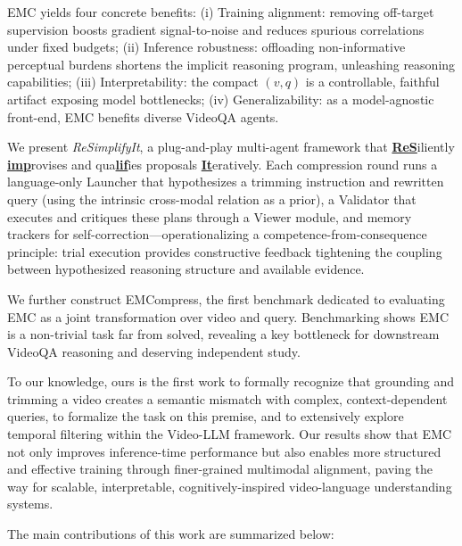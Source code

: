EMC yields four concrete benefits: (i) Training alignment: removing off-target supervision boosts gradient signal-to-noise and reduces spurious correlations under fixed budgets; (ii) Inference robustness: offloading non-informative perceptual burdens shortens the implicit reasoning program, unleashing reasoning capabilities; (iii) Interpretability: the compact $(v, q)$ is a controllable, faithful artifact exposing model bottlenecks; (iv) Generalizability: as a model-agnostic front-end, EMC benefits diverse VideoQA agents.

We present \textit{ReSimplifyIt}, a plug-and-play multi-agent framework that \underline{\textbf{ReS}}iliently \underline{\textbf{imp}}rovises and qua\underline{\textbf{lif}}ies proposals \underline{\textbf{It}}eratively. Each compression round runs a language-only Launcher that hypothesizes a trimming instruction and rewritten query (using the intrinsic cross-modal relation as a prior), a Validator that executes and critiques these plans through a Viewer module, and memory trackers for self-correction---operationalizing a competence-from-consequence~\citep{brooks1991intelligence} principle: trial execution provides constructive feedback tightening the coupling between hypothesized reasoning structure and available evidence.

We further construct EMCompress, the first benchmark dedicated to evaluating EMC as a joint transformation over video and query. Benchmarking shows EMC is a non-trivial task far from solved, revealing a key bottleneck for downstream VideoQA reasoning and deserving independent study.

To our knowledge, ours is the first work to formally recognize that grounding and trimming a video creates a semantic mismatch with complex, context-dependent queries, to formalize the task on this premise, and to extensively explore temporal filtering within the Video-LLM framework. Our results show that EMC not only improves inference-time performance but also enables more structured and effective training through finer-grained multimodal alignment, paving the way for scalable, interpretable, cognitively-inspired video-language understanding systems.

The main contributions of this work are summarized below:

